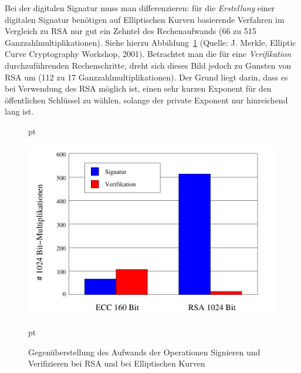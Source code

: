 \begin{refsegment}
\newpage

Bei der digitalen Signatur muss man differenzieren: für die {\em
  Erstellung} einer digitalen Signatur benötigen auf Elliptischen
Kurven basierende Verfahren im Vergleich zu RSA nur gut ein Zehntel des
Rechenaufwands (66 zu 515 Ganzzahlmultiplikationen). Siehe hierzu
Abbildung~\ref{ThousandBitMultiplications} (Quelle: J.  Merkle,
Elliptic Curve Cryptography Workshop, 2001). Betrachtet man die für eine
{\em Verifikation} durchzuführenden Rechenschritte, dreht sich dieses Bild
jedoch zu Gunsten von RSA um (112 zu 17 Ganzzahlmultiplikationen). Der
Grund liegt darin, dass es bei Verwendung des RSA möglich ist, einen sehr
kurzen Exponent für den öffentlichen Schlüssel zu wählen, solange der
private Exponent nur hinreichend lang ist.

\begin{figure}[ht]
 pt
\begin{center}
\vspace{1.5cm}\includegraphics[scale=0.7]{figures/ECCRSA}
\caption{Gegenüberstellung des Aufwands der Operationen Signieren und
         Verifizieren bei RSA und bei Elliptischen Kurven}
\label{ThousandBitMultiplications}
\end{center}
 pt
\end{figure}


\end{refsegment}
